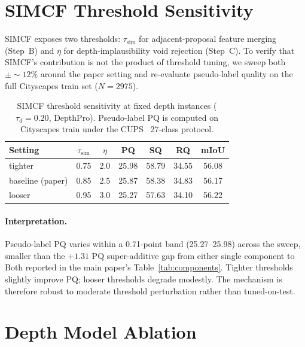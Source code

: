 \documentclass{article}
\begin{document}
\section{SIMCF Threshold Sensitivity}
\label{sec:supp:simcf_sweep}

SIMCF exposes two thresholds: $\tau_\text{sim}$ for adjacent-proposal feature merging (Step~B) and $\eta$ for depth-implausibility void rejection (Step~C). To verify that SIMCF's contribution is not the product of threshold tuning, we sweep both $\pm{\sim}12\%$ around the paper setting and re-evaluate pseudo-label quality on the full Cityscapes train set ($N{=}2975$).

\begin{table}[H]
\caption{SIMCF threshold sensitivity at fixed depth instances ($\tau_d{=}0.20$, DepthPro). Pseudo-label PQ is computed on Cityscapes train under the CUPS~\cite{hahn2025cups} 27-class protocol.}
\label{tab:simcf_sensitivity}
\centering
\small
\setlength{\tabcolsep}{6pt}
\begin{tabular}{l c c c c c c}
\toprule
Setting & $\tau_\text{sim}$ & $\eta$ & PQ & SQ & RQ & mIoU \\
\midrule
tighter         & 0.75 & 2.0 & 25.98 & 58.79 & 34.55 & 56.08 \\
baseline (paper) & 0.85 & 2.5 & 25.87 & 58.38 & 34.83 & 56.17 \\
looser          & 0.95 & 3.0 & 25.27 & 57.63 & 34.10 & 56.22 \\
\bottomrule
\end{tabular}
\end{table}

\paragraph{Interpretation.}
Pseudo-label PQ varies within a 0.71-point band (25.27--25.98) across the sweep, smaller than the $+1.31$ PQ super-additive gap from either single component to Both reported in the main paper's Table~\ref{tab:components}. Tighter thresholds slightly improve PQ; looser thresholds degrade modestly. The mechanism is therefore robust to moderate threshold perturbation rather than tuned-on-test.

\section{Depth Model Ablation}
\label{sec:supp:depth}
\end{document}
